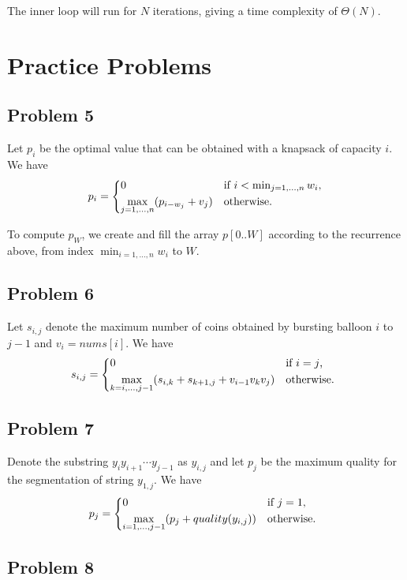 \documentclass{article}
\begin{document}
The inner loop will run for $N$ iterations, giving a time complexity of $\Theta(N)$.

\section*{Practice Problems}

\subsection*{Problem 5}

Let $p_i$ be the optimal value that can be obtained with a knapsack of capacity $i$. We have
\[
    p_i = \begin{dcases*}
        0 & if $i < \min_{j = 1, \dots, n} w_i$,\\
        \max_{j = 1, \dots, n} (p_{i - w_j} + v_j) & otherwise.\\
    \end{dcases*}
\]

To compute $p_W$, we create and fill the array $p[0..W]$ according to the recurrence above, from index $\min_{i = 1, \dots, n} w_i$ to $W$.

\subsection*{Problem 6}

Let $s_{i, j}$ denote the maximum number of coins obtained by bursting balloon $i$ to $j - 1$ and $v_i = nums[i]$. We have
\[
    s_{i, j} = \begin{dcases*}
        0 & if $i = j$,\\
        \max_{k = i, \dots, j - 1} (s_{i, k} + s_{k + 1, j} + v_{i - 1}v_kv_j) & otherwise.
    \end{dcases*}
\]

\subsection*{Problem 7}

Denote the substring $y_iy_{i + 1}{\cdots}y_{j - 1}$ as $y_{i, j}$ and let $p_j$ be the maximum quality for the segmentation of string $y_{1, j}$. We have
\[
    p_j = \begin{dcases*}
        0 & if $j = 1$,\\
        \max_{i = 1, \dots, j - 1}(p_j + quality(y_{i, j})) & otherwise.
    \end{dcases*}
\]

\subsection*{Problem 8}
\end{document}
